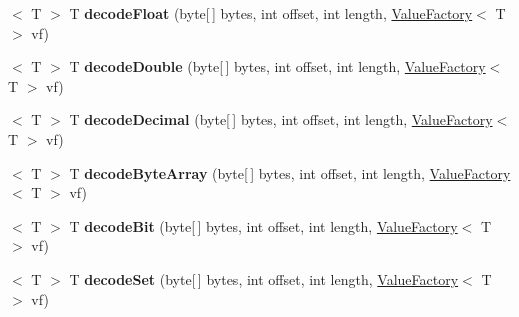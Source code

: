 \begin{DoxyCompactItemize}
\item 
\mbox{\label{interfacecom_1_1mysql_1_1cj_1_1protocol_1_1_value_decoder_af0d9ab928fea5ae9f99dcf97296a00ee}} 
$<$ T $>$ T {\bfseries decode\+Float} (byte\mbox{[}$\,$\mbox{]} bytes, int offset, int length, \mbox{\hyperlink{interfacecom_1_1mysql_1_1cj_1_1result_1_1_value_factory}{Value\+Factory}}$<$ T $>$ vf)
\item 
\mbox{\label{interfacecom_1_1mysql_1_1cj_1_1protocol_1_1_value_decoder_ad58ceda1ebe3f6dac6384aa2d75a252d}} 
$<$ T $>$ T {\bfseries decode\+Double} (byte\mbox{[}$\,$\mbox{]} bytes, int offset, int length, \mbox{\hyperlink{interfacecom_1_1mysql_1_1cj_1_1result_1_1_value_factory}{Value\+Factory}}$<$ T $>$ vf)
\item 
\mbox{\label{interfacecom_1_1mysql_1_1cj_1_1protocol_1_1_value_decoder_a674c684fca16f098e37f69d6aadb6373}} 
$<$ T $>$ T {\bfseries decode\+Decimal} (byte\mbox{[}$\,$\mbox{]} bytes, int offset, int length, \mbox{\hyperlink{interfacecom_1_1mysql_1_1cj_1_1result_1_1_value_factory}{Value\+Factory}}$<$ T $>$ vf)
\item 
\mbox{\label{interfacecom_1_1mysql_1_1cj_1_1protocol_1_1_value_decoder_aeb1bd23aa0b1f9c71fd15b0eda8dc242}} 
$<$ T $>$ T {\bfseries decode\+Byte\+Array} (byte\mbox{[}$\,$\mbox{]} bytes, int offset, int length, \mbox{\hyperlink{interfacecom_1_1mysql_1_1cj_1_1result_1_1_value_factory}{Value\+Factory}}$<$ T $>$ vf)
\item 
\mbox{\label{interfacecom_1_1mysql_1_1cj_1_1protocol_1_1_value_decoder_a200033b8cceea3e29c1025302861d5a2}} 
$<$ T $>$ T {\bfseries decode\+Bit} (byte\mbox{[}$\,$\mbox{]} bytes, int offset, int length, \mbox{\hyperlink{interfacecom_1_1mysql_1_1cj_1_1result_1_1_value_factory}{Value\+Factory}}$<$ T $>$ vf)
\item 
\mbox{\label{interfacecom_1_1mysql_1_1cj_1_1protocol_1_1_value_decoder_a9bfce5e392167ea482dc9b64ea235c43}} 
$<$ T $>$ T {\bfseries decode\+Set} (byte\mbox{[}$\,$\mbox{]} bytes, int offset, int length, \mbox{\hyperlink{interfacecom_1_1mysql_1_1cj_1_1result_1_1_value_factory}{Value\+Factory}}$<$ T $>$ vf)
\end{DoxyCompactItemize}


